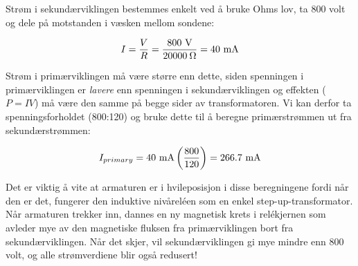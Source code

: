\vskip 10pt

Strøm i sekundærviklingen bestemmes enkelt ved å bruke Ohms lov, ta 800 volt og dele på motstanden i væsken mellom sondene:

$$I = {V \over R} = {800 \hbox{ V} \over 20000 \> \Omega} = 40 \hbox{ mA}$$

\vskip 10pt

Strøm i primærviklingen må være større enn dette, siden spenningen i primærviklingen er {\it lavere} enn spenningen i sekundærviklingen og effekten ($P = IV$) må være den samme på begge sider av transformatoren.  Vi kan derfor ta spenningsforholdet (800:120) og bruke dette til å beregne primærstrømmen ut fra sekundærstrømmen:

$$I_{primary} = 40 \hbox{ mA} \left( 800 \over 120 \right) = 266.7 \hbox{ mA}$$

\vskip 10pt

Det er viktig å vite at armaturen er i hvileposisjon i disse beregningene fordi når den er det, fungerer den induktive nivåreléen som en enkel step-up-transformator.  Når armaturen trekker inn, dannes en ny magnetisk krets i relékjernen som avleder mye av den magnetiske fluksen fra primærviklingen bort fra sekundærviklingen.  Når det skjer, vil sekundærviklingen gi mye mindre enn 800 volt, og alle strømverdiene blir også redusert!


